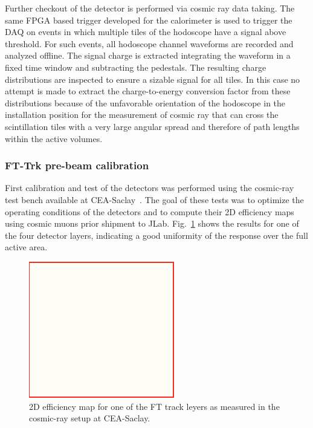 Further checkout of the detector is performed via cosmic ray data taking. The same FPGA based trigger developed for the calorimeter is used to trigger the DAQ on events in which multiple tiles of the hodoscope have a signal above threshold. For such events, all hodoscope channel waveforms are recorded and analyzed offline. The signal charge is extracted integrating the waveform in a fixed time window and subtracting the pedestals. The resulting charge distributions are inspected to ensure a sizable signal for all tiles. In this case no attempt is made to extract the charge-to-energy conversion factor from these distributions because of the unfavorable orientation of the hodoscope in the installation position for the measurement of cosmic ray that can cross the scintillation tiles with a very large angular spread and therefore of path lengths within the active volumes.

\subsubsection{FT-Trk pre-beam calibration}
First calibration and test of the detectors was performed using the cosmic-ray test bench available at CEA-Saclay~\cite{mm}. The goal of these tests was to optimize the operating conditions
of the detectors and to compute their 2D efficiency maps using cosmic muons prior shipment to JLab. Fig.~\ref{fig:ftt_cosmic} shows the results for one of the four detector layers, indicating a good uniformity of the response over the full active area.

\begin{figure}[htb]
 \includegraphics[width=1.0\columnwidth,keepaspectratio]{fig/dummy.png}
 \caption{2D efficiency map for one of the FT track leyers as measured in the cosmic-ray setup at CEA-Saclay.}
 \label{fig:ftt_cosmic}
\end{figure}

